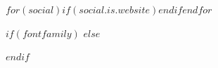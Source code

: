 %
\newcommand{\jrnamelink}[1]{#1}
$for(social)$$if(social.is.website)$\renewcommand{\jrnamelink}[1]{\href{$social.url$}{#1}}$endif$$endfor$
\newif\ifjrfirstcontact
\newcommand{\jrcontactsep}{\\}
\newcommand{\jrcontact}[1]{\ifjrfirstcontact\jrfirstcontactfalse\else\jrcontactsep\fi #1}
\newcommand{\jrcontacts}{%
  \jrfirstcontacttrue
  $for(social)$%
  $if(social.is.email)$\jrcontact{Email: \href{$social.url$}{$social.label$}}$elseif(social.is.phone)$\jrcontact{Mobile: \href{$social.url$}{$social.label$}}$elseif(social.is.github)$\jrcontact{\href{$social.url$}{github.com/$social.label$}}$elseif(social.is.linkedin)$\jrcontact{\href{$social.url$}{linkedin.com/in/$social.label$}}$elseif(social.url)$\jrcontact{\href{$social.url$}{$social.label$}}$else$\jrcontact{$social.label$}$endif$%
  $endfor$%
}

$if(fontfamily)$
$else$
\ifPDFTeX
  \usepackage{lmodern}
\fi
$endif$

